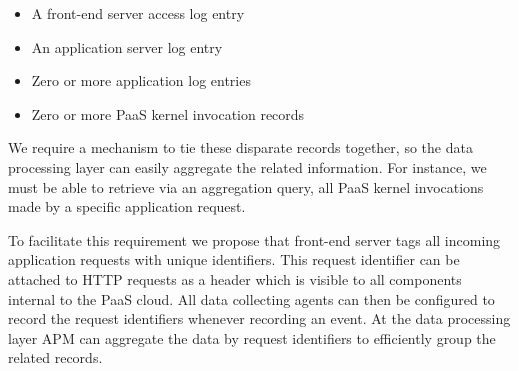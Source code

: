\documentclass[11pt]{article}
\begin{document}
\begin{itemize}
\item A front-end server access log entry
\item An application server log entry
\item Zero or more application log entries
\item Zero or more PaaS kernel invocation records
\end{itemize}

We require a mechanism to tie these disparate records together, so the data processing layer can easily
aggregate the related information. For instance, we must be able to retrieve via an
aggregation query, all PaaS kernel invocations made by a specific application request.

To facilitate this requirement we propose that front-end server tags all incoming application requests 
with unique identifiers.
This request identifier can be attached to HTTP requests as a header which is visible to all components 
internal to the PaaS cloud. All data collecting agents can then be configured to record the request identifiers
whenever recording an event. At the data processing layer APM can aggregate the data by request identifiers
to efficiently group the related records.
\end{document}
